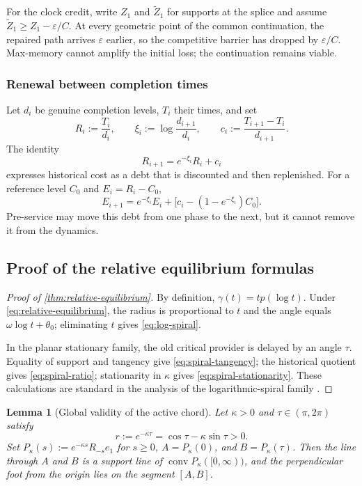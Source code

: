 \documentclass[10pt,a4paper]{article}
\newtheorem{lemma}[lemma]{Lemma}
\theoremstyle{definition}
\theoremstyle{remark}
\DeclareMathOperator{\conv}{conv}
\newcommand{\eps}{\varepsilon}
\begin{document}
For the clock credit, write $Z_1$ and $\widetilde Z_1$ for supports at the splice and assume $\widetilde Z_1\ge Z_1-\eps/C$. At every geometric point of the common continuation, the repaired path arrives $\eps$ earlier, so the competitive barrier has dropped by $\eps/C$. Max-memory cannot amplify the initial loss; the continuation remains viable.

\subsubsection{Renewal between completion times}
Let $d_i$ be genuine completion levels, $T_i$ their times, and set
\[
R_i:=\frac{T_i}{d_i},
\qquad
\xi_i:=\log\frac{d_{i+1}}{d_i},
\qquad
c_i:=\frac{T_{i+1}-T_i}{d_{i+1}}.
\]
The identity
\begin{equation}
R_{i+1}=e^{-\xi_i}R_i+c_i
\label{eq:completion-cocycle}
\end{equation}
expresses historical cost as a debt that is discounted and then replenished. For a reference level $C_0$ and $E_i=R_i-C_0$,
\[
E_{i+1}=e^{-\xi_i}E_i+
\bigl[c_i-(1-e^{-\xi_i})C_0\bigr].
\]
Pre-service may move this debt from one phase to the next, but it cannot remove it from the dynamics.

\subsection{Proof of the relative equilibrium formulas}
\begin{proof}[Proof of \cref{thm:relative-equilibrium}]
By definition, $\gamma(t)=tp(\log t)$. Under \eqref{eq:relative-equilibrium}, the radius is proportional to $t$ and the angle equals $\omega\log t+\theta_0$; eliminating $t$ gives \eqref{eq:log-spiral}.

In the planar stationary family, the old critical provider is delayed by an angle $\tau$. Equality of support and tangency give \eqref{eq:spiral-tangency}; the historical quotient gives \eqref{eq:spiral-ratio}; stationarity in $\kappa$ gives \eqref{eq:spiral-stationarity}. These calculations are standard in the analysis of the logarithmic-spiral family \cite{FinchSpiral}.
\end{proof}

\begin{lemma}[Global validity of the active chord]
\label{lem:active-chord}
Let $\kappa>0$ and $\tau\in(\pi,2\pi)$ satisfy
\[
r:=e^{-\kappa\tau}=\cos\tau-\kappa\sin\tau>0.
\]
Set $P_\kappa(s):=e^{-\kappa s}R_{-s}e_1$ for $s\ge0$, $A=P_\kappa(0)$, and $B=P_\kappa(\tau)$. Then the line through $A$ and $B$ is a support line of $\conv P_\kappa([0,\infty))$, and the perpendicular foot from the origin lies on the segment $[A,B]$.
\end{lemma}
\end{document}
